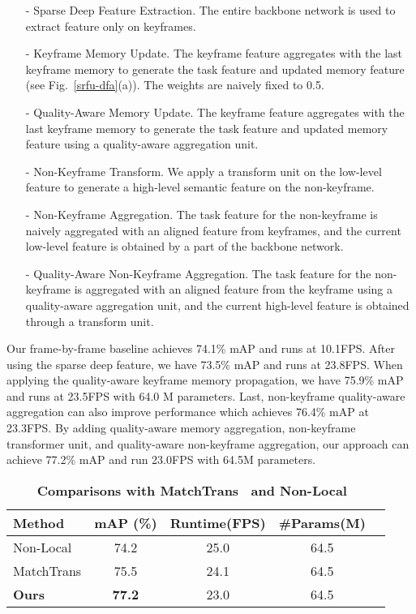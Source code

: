 \documentclass[runningheads]{llncs}
\begin{document}
\begin{itemize}
\item[-] Sparse Deep Feature Extraction. The entire backbone network is used to extract feature only on keyframes.
\item[-] Keyframe Memory Update. The keyframe feature aggregates with the last keyframe memory to generate the task feature and updated memory feature (see Fig.~\ref{srfu-dfa}(a)). The weights are naively fixed to 0.5.
\item[-] Quality-Aware Memory Update. The keyframe feature aggregates with the last keyframe memory to generate the task feature and updated memory feature using a quality-aware aggregation unit.
\item[-] Non-Keyframe Transform. We apply a transform unit on the low-level feature to generate a high-level semantic feature on the non-keyframe.
\item[-] Non-Keyframe Aggregation. The task feature for the non-keyframe is naively aggregated with an aligned feature from keyframes, and the current low-level feature is obtained by a part of the backbone network.
\item[-] Quality-Aware Non-Keyframe Aggregation. The task feature for the non-keyframe is aggregated with an aligned feature from the keyframe using a quality-aware aggregation unit, and the current high-level feature is obtained through a transform unit.
\end{itemize}



Our frame-by-frame baseline achieves 74.1\% mAP and runs at 10.1FPS. After using the sparse deep feature, we have 73.5\% mAP and runs at 23.8FPS. When applying the quality-aware keyframe memory propagation, we have 75.9\% mAP and runs at 23.5FPS with 64.0 M parameters. Last, non-keyframe quality-aware aggregation can also improve performance which achieves 76.4\% mAP at 23.3FPS. By adding quality-aware memory aggregation, non-keyframe transformer unit, and quality-aware non-keyframe aggregation, our approach can achieve 77.2\% mAP and run 23.0FPS with 64.5M parameters.

\setlength{\tabcolsep}{4pt}
\begin{table}[t]
\centering
\caption{\textbf{Comparisons with MatchTrans~\cite{xiao2018video} and Non-Local~\cite{wang2018non}}}
\begin{tabular}[t]{lcccc}
\toprule
Method  & mAP (\%)  & Runtime(FPS) & \#Params(M)  \\
\midrule
Non-Local & 74.2 & 25.0 & 64.5 \\
MatchTrans & 75.5 & 24.1 & 64.5\\
\textbf{Ours} & \textbf{77.2} & 23.0 & 64.5\\
\bottomrule
\end{tabular}
\label{table:comparison-lsts-matchtrans}
\end{table}
\end{document}
